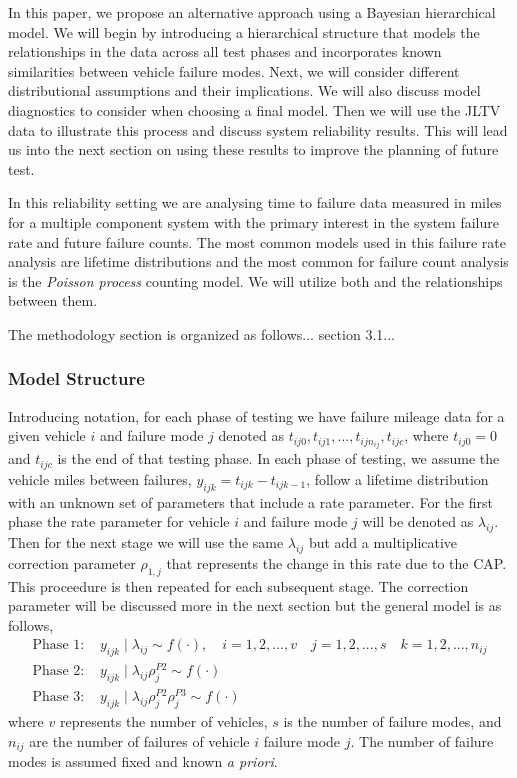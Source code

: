 \documentclass[12pt]{article}
\begin{document}
In this paper, we propose an alternative approach using a Bayesian hierarchical
model.  We will begin by introducing a hierarchical structure that models the
relationships in the data across all test phases and incorporates known
similarities between vehicle failure modes.  Next, we will consider different
distributional assumptions and their implications.  We will also
discuss model diagnostics to consider when choosing a final model. Then we will
use the JLTV data to illustrate this process and discuss system reliability
results. This will lead us into the next section on using these results to
improve the planning of future test.

In this reliability setting we are analysing time to failure data measured in
miles for a multiple component system with the primary interest in the system
failure rate and future failure counts.  The most common models used in this
failure rate analysis are lifetime distributions and the most common for failure
count analysis is the \emph{Poisson process} counting model.  We will utilize
both and the relationships between them.

The methodology section is organized as follows... section 3.1...

\subsubsection{Model Structure}
Introducing notation, for each phase of testing we have failure mileage data for
a given vehicle $i$ and failure mode $j$ denoted as $t_{ij0}, t_{ij1},...,
t_{ijn_{ij}}, t_{ijc}$, where $t_{ij0} = 0$ and $t_{ijc}$ is the end of that
testing phase. In each phase of testing, we assume the vehicle miles between
failures, $y_{ijk} = t_{ijk} - t_{ijk-1}$, follow a lifetime distribution with
an unknown set of parameters that include a rate parameter.  For the first phase
the rate parameter for vehicle $i$ and failure mode $j$ will be denoted as
$\lambda_{ij}$.  Then for the next stage we will use the same $\lambda_{ij}$ but
add a multiplicative correction parameter $\rho_{1,j}$ that represents the
change in this rate due to the CAP.  This proceedure is then repeated for each
subsequent stage.  The correction parameter will be discussed more in the next
section but the general model is as follows,
\begin{align*}
\text{Phase 1: }&y_{ijk}\mid\lambda_{ij}\sim f(\cdot), \quad i = 1,2,...,v \quad
j=1,2,...,s \quad k=1,2,...,n_{ij}\\
\text{Phase 2: }&y_{ijk}\mid\lambda_{ij}\rho_{j}^{P2}\sim f(\cdot) \\
\text{Phase 3: }&y_{ijk}\mid\lambda_{ij}\rho_{j}^{P2}\rho_{j}^{P3}\sim f(\cdot)
\end{align*}
where $v$ represents the number of vehicles, $s$ is the number of failure modes,
and $n_{ij}$ are the number of failures of vehicle $i$ failure mode $j$. The
number of failure modes is assumed fixed and known \textit{a priori}.
\end{document}
